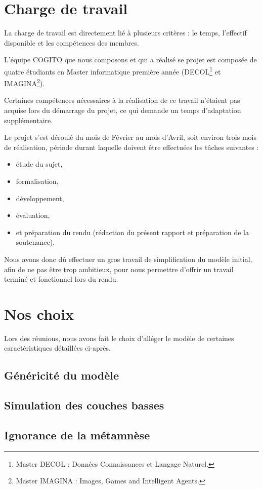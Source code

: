 \section{Charge de travail}
La charge de travail est directement lié à plusieurs critères : le temps, l'effectif disponible et les compétences des membres.

L'équipe COGITO que nous composons et qui a réalisé se projet est composée de quatre étudiants en Master informatique première année (DECOL\footnote{Master DECOL : Données Connaissances et Langage Naturel.} et IMAGINA\footnote{Master IMAGINA : Images, Games and Intelligent Agents.}).

Certaines compétences nécessaires à la réalisation de ce travail n'étaient pas acquise lors du démarrage du projet, ce qui demande un temps d'adaptation supplémentaire.

Le projet s'est déroulé du mois de Février au mois d'Avril, soit environ trois mois de réalisation, période durant laquelle doivent être effectuées les tâches suivantes :

\begin{itemize}
\item étude du sujet, 
\item formalisation, 
\item développement, 
\item évaluation,
\item et préparation du rendu (rédaction du présent rapport et préparation de la soutenance).
\end{itemize}

Nous avons donc dû effectuer un gros travail de simplification du modèle initial, afin de ne pas être trop ambitieux, pour nous permettre d'offrir un travail terminé et fonctionnel lors du rendu.


\section{Nos choix}

Lors des réunions, nous avons fait le choix d'alléger le modèle de certaines caractéristiques détaillées ci-après.

\subsection{Généricité du modèle}
\subsection{Simulation des couches basses}
\subsection{Ignorance de la métamnèse}